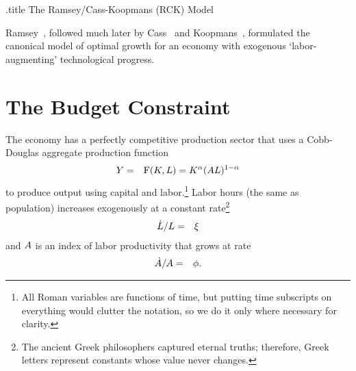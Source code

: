 \documentclass{handout}
\begin{document}
\handoutHeader

\begin{verbatimwrite}{\jobname.title}
  The Ramsey/Cass-Koopmans (RCK) Model
\end{verbatimwrite}

\handoutNameMake



\renewcommand{\cite}{\citeyearpar}

Ramsey~\cite{ramseySave}, followed much later by Cass~\cite{cass:growth} and Koopmans~\cite{koopmans:growth}, formulated the canonical model of optimal growth for an economy with exogenous `labor-augmenting' technological progress.

\section{The Budget Constraint}

The economy has a perfectly competitive production sector that uses a Cobb-Douglas aggregate production function 
\begin{eqnarray}
                   {Y} & = & \mathrm{F}({K},L) = {K}^{\alpha}(A L)^{1-\alpha}
\end{eqnarray}
to produce output using capital and labor.\footnote{All Roman variables are functions of time, but putting time subscripts on everything would clutter the notation, so we do it only where necessary for clarity.}  Labor hours (the same as population) increases exogenously at a constant rate\footnote{The ancient Greek philosophers captured eternal truths; therefore, Greek letters represent constants whose value never changes.}
\begin{eqnarray}
  \dot{L}/L & = & \xi
\end{eqnarray}
and $A $ is an index of labor productivity that grows at rate 
\begin{eqnarray}
  \dot{A }/A  & = & \phi. 
\end{eqnarray}
\end{document}
